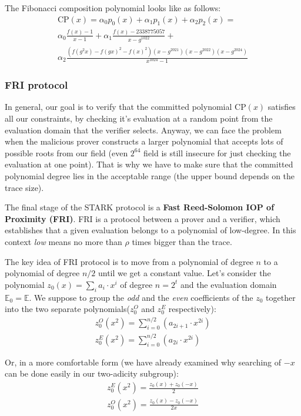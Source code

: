\documentclass[../lecture-notes-148x210.tex]{subfiles}
\begin{document}
\begin{example}
The Fibonacci composition polynomial looks like as follows:
\begin{gather*}
    \text{CP}(x) = \alpha_0 p_0(x) + \alpha_1 p_1(x) + \alpha_2 p_2(x) =\\
    \alpha_0 \frac{f(x)-1}{x - 1} + \alpha_1 \frac{f(x) - 2338775057}{x - g^{1022}} + \\
    \alpha_2 \frac{(f(g^2x) - f(gx)^2 - f(x)^2)(x - g^{2021})(x - g^{2022})(x - g^{2024})}{x^{1024} - 1}
\end{gather*}
\end{example}

\subsubsection{FRI protocol}
In general, our goal is to verify that the committed polynomial $\text{CP}(x)$
satisfies all our constraints, by checking it's evaluation at a random point
from the evaluation domain that the verifier selects. Anyway, we can face the
problem when the malicious prover constructs a larger polynomial that accepts
lots of possible roots from our field (even $2^{64}$ field is still insecure for
just checking the evaluation at one point). That is why we have to make sure
that the committed polynomial degree lies in the acceptable range (the upper
bound depends on the trace size).

The final stage of the STARK protocol is a \textbf{Fast Reed-Solomon IOP of Proximity (FRI)}. FRI is a protocol between a prover and a verifier, which establishes that a given evaluation belongs to a polynomial of low-degree. In this context \textit{low} means no more than $\rho$ times bigger than the trace.

The key idea of FRI protocol is to move from a polynomial of degree $n$ to a
polynomial of degree $n/2$ until we get a constant value. Let's consider the
polynomial $z_0(x) = \sum_i a_i\cdot x^i$ of degree $n=2^t$ and the evaluation
domain $\mathbb{E}_0 = \mathbb{E}$. We suppose to group the \textit{odd} and the
\textit{even} coefficients of the $z_0$ together into the two separate
polynomials($z_0^O$ and $z_0^E$ respectively):
\begin{gather*}
    z_0^O(x^2) = \sum_{i=0}^{n/2} (a_{2i+1}\cdot x^{2i})\\
    z_0^E(x^2) = \sum_{i=0}^{n/2} (a_{2i}\cdot x^{2i})
\end{gather*}

Or, in a more comfortable form (we have already examined why searching of $-x$
can be done easily in our two-adicity subgroup):
\begin{gather*}
    z_0^E(x^2) = \frac{z_0(x) + z_0(-x)}{2}\\
    z_0^O(x^2) = \frac{z_0(x) - z_0(-x)}{2x}
\end{gather*}
\end{document}
